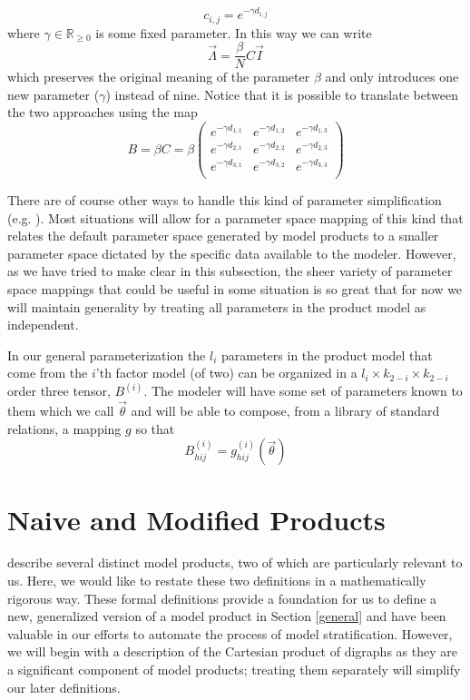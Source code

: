 \documentclass{article}
\theoremstyle{definition}
\newcommand{\Rnn}{\mathbb{R}_{\ge 0}}%
\begin{document}
\[
    c_{i,j} = e^{-\gamma d_{i,j}}
\]
where $\gamma \in \Rnn$ is some fixed parameter. In this way we can write
\[
    \vec{\Lambda} = \frac{\beta}{N} C \vec{I}
\]
which preserves the original meaning of the parameter $\beta$ and only introduces one new parameter ($\gamma$) instead of nine. Notice that it is possible to translate between the two approaches using the map
\[
    B = \beta C = \beta \begin{pmatrix} 
                        e^{-\gamma d_{1,1}} & e^{-\gamma d_{1,2}} & e^{-\gamma d_{1,3}} \\
                        e^{-\gamma d_{2,1}} & e^{-\gamma d_{2,2}} & e^{-\gamma d_{2,3}} \\
                        e^{-\gamma d_{3,1}} & e^{-\gamma d_{3,2}} & e^{-\gamma d_{3,3}} \\
                        \end{pmatrix}
\]

There are of course other ways to handle this kind of parameter simplification (e.g. \cite{andemay85, andemaybook, grenande85}). Most situations will allow for a parameter space mapping of this kind that relates the default parameter space generated by model products to a smaller parameter space dictated by the specific data available to the modeler. However, as we have tried to make clear in this subsection, the sheer variety of parameter space mappings that could be useful in some situation is so great that for now we will maintain generality by treating all parameters in the product model as independent.

In our general parameterization the $l_i$ parameters in the product model that come from the $i$'th factor model (of two) can be organized in a $l_i \times k_{2-i} \times k_{2-i}$ order three tensor, $B^{(i)}$. The modeler will have some set of parameters known to them which we call $\vec{\theta}$ and will be able to compose, from a library of standard relations, a mapping $g$ so that
$$
B_{hij}^{(i)} = g_{hij}^{(i)}(\vec{\theta})
$$

\section{Naive and Modified Products}\label{worden}

\cite{worden2017products} describe several distinct model products, two of which are particularly relevant to us. Here, we would like to restate these two definitions in a mathematically rigorous way. These formal definitions provide a foundation for us to define a new, generalized version of a model product in Section \ref{general} and have been valuable in our efforts to automate the process of model stratification. However, we will begin with a description of the Cartesian product of digraphs as they are a significant component of model products; treating them separately will simplify our later definitions.
\end{document}
